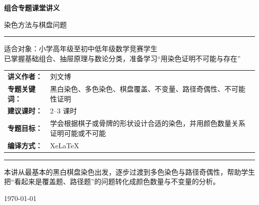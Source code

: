 \documentclass[11pt,a4paper,fontset=fandol]{ctexart}
\theoremstyle{formaltheorem}
\theoremstyle{formalexample}
\begin{document}
\thispagestyle{empty}
\begin{titlepage}
\centering
\vspace*{0.9cm}

\begin{tcolorbox}[
  enhanced,
  width=0.92\textwidth,
  colback=white,
  colframe=mainblue,
  boxrule=1pt,
  arc=0mm,
  left=6mm,
  right=6mm,
  top=8mm,
  bottom=8mm
]
\centering

{\fontsize{24}{30}\selectfont\bfseries 组合专题课堂讲义\par}
\vspace{0.7cm}
{\fontsize{17}{22}\selectfont 染色方法与棋盘问题\par}

\vspace{1.1cm}
\color{rulegray}\rule{0.72\textwidth}{0.7pt}\par
\vspace{1cm}

\begin{tcolorbox}[colback=lightblue,colframe=mainblue,width=0.82\textwidth,boxrule=1pt]
\centering
{\Large 适合对象：小学高年级至初中低年级数学竞赛学生}\\[0.4em]
{\large 已掌握基础组合、抽屉原理与数论分类，准备学习“用染色证明不可能与存在”}
\end{tcolorbox}

\vspace{1.2cm}

\renewcommand{\arraystretch}{1.42}
\begin{tabular}{>{\bfseries}p{3.5cm}p{8cm}}
讲义作者： & 刘文博 \\
专题关键词： & 黑白染色、多色染色、棋盘覆盖、不变量、路径奇偶性、不可能性证明 \\
建议课时： & 2--3 课时 \\
专题目标： & 学会根据棋子或骨牌的形状设计合适的染色，并用颜色数量关系证明可能或不可能 \\
编译方式： & XeLaTeX \\
\end{tabular}

\vspace{1.2cm}
\color{rulegray}\rule{0.72\textwidth}{0.7pt}\par
\vspace{0.8cm}

{\normalsize 本讲从最基本的黑白棋盘染色出发，逐步过渡到多色染色与路径奇偶性，帮助学生把“看起来是覆盖题、路径题”的问题转化成颜色数量与不变量的分析。\par}

\vspace{0.5cm}
{\large \today\par}
\end{tcolorbox}
\end{titlepage}
\end{document}
